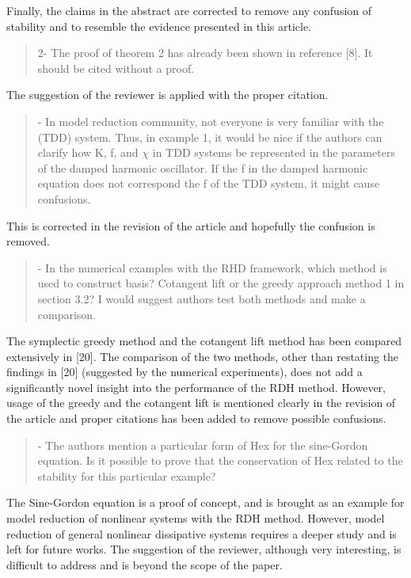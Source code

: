 \documentclass[a4paper]{article}
\newcommand{\breview}{\begin{quotation}\begin{bf}\noindent}
\newcommand{\ereview}{\end{bf}\end{quotation}}
\begin{document}
Finally, the claims in the abstract are corrected to remove any confusion of stability and to resemble the evidence presented in this article.

\breview

2- The proof of theorem 2 has already been shown in reference [8]. It should be cited without a proof.

\ereview

The suggestion of the reviewer is applied with the proper citation.

\breview
3- In model reduction community, not everyone is very familiar with the (TDD) system. Thus, in example 1, it would be nice if the authors can clarify how K, f, and $\chi$ in TDD systems be represented in the parameters of the damped harmonic oscillator. If the f in the damped harmonic equation does not correspond the f of the TDD system, it might cause  confusions. 
\ereview

This is corrected in the revision of the article and hopefully the confusion is removed.

\breview
4- In the numerical examples with the RHD framework, which method is used to construct basis? Cotangent lift or the greedy approach method 1 in section 3.2? I would suggest authors test both methods and make a comparison. 
\ereview

The symplectic greedy method and the cotangent lift method has been compared extensively in [20]. The comparison of the two methods, other than restating the findings in [20] (suggested by the numerical experiments), does not add a significantly novel insight into the performance of the RDH method. However, usage of the greedy and the cotangent lift is mentioned clearly in the revision of the article and proper citations has been added to remove possible confusions.

\breview
5- The authors mention a particular form of Hex for the sine-Gordon equation. Is it possible to prove that the conservation of Hex related to the stability for this particular example?
\ereview

The Sine-Gordon equation is a proof of concept, and is brought as an example for model reduction of nonlinear systems with the RDH method. However, model reduction of general nonlinear dissipative systems requires a deeper study and is left for future works. The suggestion of the reviewer, although very interesting, is difficult to address and is beyond the scope of the paper.
\end{document}
